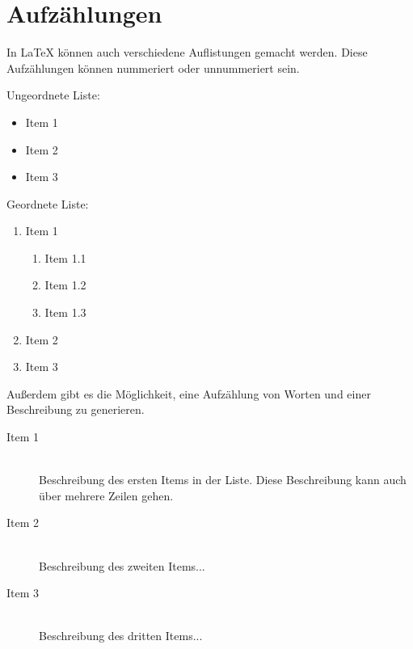 \section{Aufzählungen}

In \LaTeX{} können auch verschiedene Auflistungen gemacht werden. Diese
Aufzählungen können nummeriert oder unnummeriert sein.

Ungeordnete Liste:
\begin{itemize}
    \item Item 1
    \item Item 2
    \item Item 3
\end{itemize}

Geordnete Liste:
\begin{enumerate}
    \item Item 1
    \begin{enumerate}
        \item Item 1.1
        \item Item 1.2
        \item Item 1.3
    \end{enumerate}
    \item Item 2
    \item Item 3
\end{enumerate}

Außerdem gibt es die Möglichkeit, eine Aufzählung von Worten und einer
Beschreibung zu generieren.

\begin{description}
    \item[Item 1] \hfill \\
        Beschreibung des ersten Items in der Liste. Diese Beschreibung kann auch
        über mehrere Zeilen gehen.
    \item[Item 2] \hfill \\
        Beschreibung des zweiten Items...
    \item[Item 3] \hfill \\
        Beschreibung des dritten Items...
\end{description}